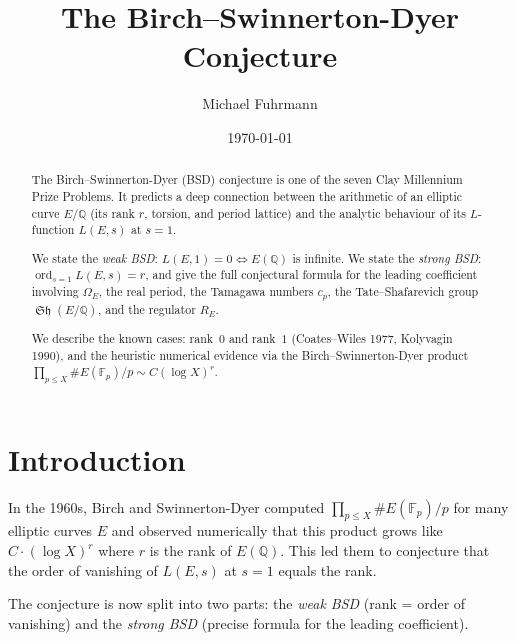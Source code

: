 \documentclass[12pt,a4paper]{amsart}
\theoremstyle{definition}
\newcommand{\Q}{\mathbb{Q}}
\newcommand{\Fp}{\mathbb{F}_p}
\DeclareMathOperator{\ord}{ord}
\DeclareMathOperator{\Sha}{\mathfrak{Sh}}
\begin{document}

\title{The Birch--Swinnerton-Dyer Conjecture}

\author{Michael Fuhrmann}
\address{Specialist Mathematics Project, Build 84}
\date{\today}

\begin{abstract}
The Birch--Swinnerton-Dyer (BSD) conjecture is one of the seven Clay
Millennium Prize Problems.
It predicts a deep connection between the arithmetic of an elliptic curve
$E/\Q$ (its rank $r$, torsion, and period lattice) and the analytic
behaviour of its $L$-function $L(E,s)$ at $s=1$.

We state the \emph{weak BSD}: $L(E,1) = 0 \iff E(\Q)$ is infinite.
We state the \emph{strong BSD}: $\ord_{s=1}L(E,s) = r$, and give the
full conjectural formula for the leading coefficient involving
$\Omega_E$, the real period, the Tamagawa numbers $c_p$,
the Tate--Shafarevich group $\Sha(E/\Q)$, and the regulator $R_E$.

We describe the known cases: rank~$0$ and rank~$1$ (Coates--Wiles 1977,
Kolyvagin 1990), and the heuristic numerical evidence via the
Birch--Swinnerton-Dyer product $\prod_{p \le X} \#E(\Fp)/p \sim C(\log X)^r$.
\end{abstract}

\maketitle
\tableofcontents

\section{Introduction}

In the 1960s, Birch and Swinnerton-Dyer \cite{BSD1965} computed
$\prod_{p \le X} \#E(\Fp)/p$ for many elliptic curves $E$ and observed
numerically that this product grows like $C \cdot (\log X)^r$ where $r$
is the rank of $E(\Q)$.
This led them to conjecture that the order of vanishing of $L(E,s)$
at $s = 1$ equals the rank.

The conjecture is now split into two parts:
the \emph{weak BSD} (rank = order of vanishing) and the
\emph{strong BSD} (precise formula for the leading coefficient).

\end{document}
